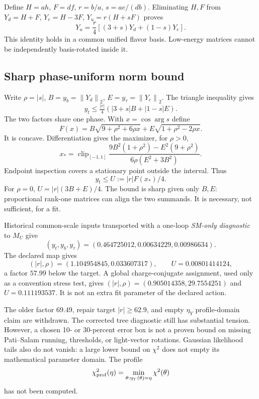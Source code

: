 \documentclass[11pt]{article}
\newcommand{\norm}[1]{\left\lVert#1\right\rVert_2}
\begin{document}
Define $H=ah$, $F=df$, $r=b/a$, $s=ae/(db)$. Eliminating $H,F$ from
$Y_d=H+F$, $Y_e=H-3F$, $Y_u=r(H+sF)$ proves
\begin{equation}
\boxed{Y_u=\frac r4[(3+s)Y_d+(1-s)Y_e].}
\label{eq:identity}
\end{equation}
This identity holds in a common unified flavor basis.
Low-energy matrices cannot be independently basis-rotated inside it.

\subsection{Sharp phase-uniform norm bound}
Write $\rho=|s|$, $B=y_b=\norm{Y_d}$, $E=y_\tau=\norm{Y_e}$.
The triangle inequality gives
\[
y_t\le\tfrac{|r|}{4}(|3+s|B+|1-s|E).
\]
The two factors share one phase. With $x=\cos\arg s$ define
\[
F(x)=B\sqrt{9+\rho^2+6\rho x}
+E\sqrt{1+\rho^2-2\rho x}.
\]
It is concave. Differentiation gives the maximizer, for $\rho>0$,
\begin{equation}
x_*=\operatorname{clip}_{[-1,1]}
\frac{9B^2(1+\rho^2)-E^2(9+\rho^2)}
{6\rho(E^2+3B^2)}.
\end{equation}
Endpoint inspection covers a stationary point outside the interval.
Thus
\begin{equation}
\boxed{y_t\le U:=|r|F(x_*)/4.}
\label{eq:bound}
\end{equation}
For $\rho=0$, $U=|r|(3B+E)/4$.
The bound is sharp given only $B,E$: proportional rank-one matrices
can align the two summands. It is necessary, not sufficient, for a fit.

Historical common-scale inputs transported with a one-loop
\emph{SM-only diagnostic} to $M_U$ give
\[
(y_t,y_b,y_\tau)=(0.464725012,0.00634229,0.00986634).
\]
The declared map gives
\[
(|r|,\rho)=(1.104954845,0.033607317),\qquad U=0.00801414124,
\]
a factor $57.99$ below the target. A global charge-conjugate assignment,
used only as a convention stress test, gives
$(|r|,\rho)=(0.905014358,29.7554251)$ and $U=0.111193537$.
It is not an extra fit parameter of the declared action.

The older factor $69.49$, repair target $|r|\ge62.9$, and empty
$\eta_Y$ profile-domain claim are withdrawn.
The corrected tree diagnostic still has substantial tension.
However, a chosen 10- or 30-percent error box is not a proven bound on
missing Pati--Salam running, thresholds, or light-vector rotations.
Gaussian likelihood tails also do not vanish: a large lower bound on
$\chi^2$ does not empty its mathematical parameter domain. The profile
\[
\chi^2_{\rm prof}(\eta)
=\min_{\theta:\eta_Y(\theta)=\eta}\chi^2(\theta)
\]
has not been computed.
\end{document}
